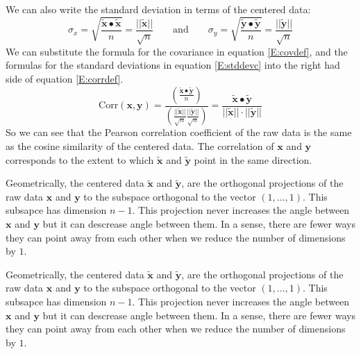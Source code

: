    We can also write the standard deviation in terms of the centered data:
\begin{equation}\label{E:stddevc}
  \sigma_x = \sqrt{ \frac{\widetilde{\mathbf{x}} \bullet \widetilde{\mathbf{x}}}{n}}
= \frac{||\widetilde{\mathbf{x}}||}{\sqrt{n}}
\qquad \mbox{and} \qquad 
  \sigma_y = \sqrt{ \frac{\widetilde{\mathbf{y}} \bullet \widetilde{\mathbf{y}}}{n}}
= \frac{||\widetilde{\mathbf{y}}||}{\sqrt{n}}
\end{equation}
We can substitute the formula for the covariance in equation \eqref{E:covdef},
and the formulas for the standard deviations in equation \eqref{E:stddevc}
into the right had side of equation \eqref{E:corrdef}.
\begin{equation}
\mathrm{Corr}(\mathbf{x}, \mathbf{y}) = 
\frac{\left(\displaystyle{\frac{\widetilde{\mathbf{x}} \bullet 
                                            \widetilde{\mathbf{y}}}{n}}\right)}
     {\left(\displaystyle{\frac{||\widetilde{\mathbf{x}}||}{\sqrt{n}}
               \frac{||\widetilde{\mathbf{y}}||}{\sqrt{n}} }\right)}
= \frac{\widetilde{\mathbf{x}} \bullet \widetilde{\mathbf{y}}}
       {||\widetilde{\mathbf{x}}|| \cdot ||\widetilde{\mathbf{y}}||} 
\end{equation}
So we can see that the Pearson correlation coefficient of the raw data is the
same as the cosine similarity of the centered data.  The correlation of 
$\mathbf{x}$ and $\mathbf{y}$ corresponds to the extent to which 
$\widetilde{\mathbf{x}}$ and $\widetilde{\mathbf{y}}$ point in the same 
direction.

    Geometrically, the centered data $\widetilde{\mathbf{x}}$ and 
$\widetilde{\mathbf{y}}$, are the orthogonal projections of the raw data 
$\mathbf{x}$ and $\mathbf{y}$ to the subspace orthogonal to the vector 
$(1, \dots, 1)$.  This subsapce has dimension $n - 1$.  This projection 
never increases the angle between $\mathbf{x}$ and $\mathbf{y}$ but it can 
descrease angle between them.  In a sense, there are fewer ways they can point 
away from each other when we reduce the number of dimensions by $1$. 

    Geometrically, the centered data $\tilde{\mathbf{x}}$ and 
$\tilde{\mathbf{y}}$, are the orthogonal projections of the raw data 
$\mathbf{x}$ and $\mathbf{y}$ to the subspace orthogonal to the vector 
$(1, \dots, 1)$.  This subsapce has dimension $n - 1$.  This projection 
never increases the angle between $\mathbf{x}$ and $\mathbf{y}$ but it can 
descrease angle between them.  In a sense, there are fewer ways they can point 
away from each other when we reduce the number of dimensions by $1$. 


